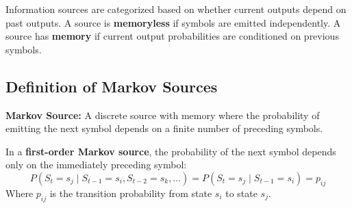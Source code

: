\documentclass[12pt,a4paper]{article}
\begin{document}
Information sources are categorized based on whether current outputs depend on past outputs. A source is \textbf{memoryless} if symbols are emitted independently. A source has \textbf{memory} if current output probabilities are conditioned on previous symbols.

\subsection{Definition of Markov Sources}
\begin{tcolorbox}[defbox]
\textbf{Markov Source:} A discrete source with memory where the probability of emitting the next symbol depends on a finite number of preceding symbols.
\par\vspace{3pt}
In a \textbf{first-order Markov source}, the probability of the next symbol depends only on the immediately preceding symbol:
\begin{equation}
  P(S_t = s_j \mid S_{t-1} = s_i, S_{t-2} = s_k, \dots) = P(S_t = s_j \mid S_{t-1} = s_i) = p_{ij}
\end{equation}
Where $p_{ij}$ is the transition probability from state $s_i$ to state $s_j$.
\end{tcolorbox}

\begin{tcolorbox}[tikzbox, title={State Transition Diagram of a 2-State Markov Source}]
\centering
{}
\end{tcolorbox}
\end{document}
